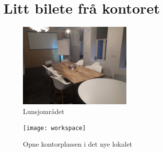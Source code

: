 \documentclass[12pt]{article}
\begin{document}
\section{Litt bilete frå kontoret}

\begin{figure}[!h]
  \includegraphics[width=0.5\textwidth]{lunsj}
  \centering
  \caption{Lunsjområdet}
  \label{fig:lunsj1}
\end{figure}

\begin{figure}[!h]
  \texttt{[image: workspace]}
  \centering
  \caption{Opne kontorplassen i det nye lokalet}
  \label{fig:workspace1}
\end{figure}
\end{document}
